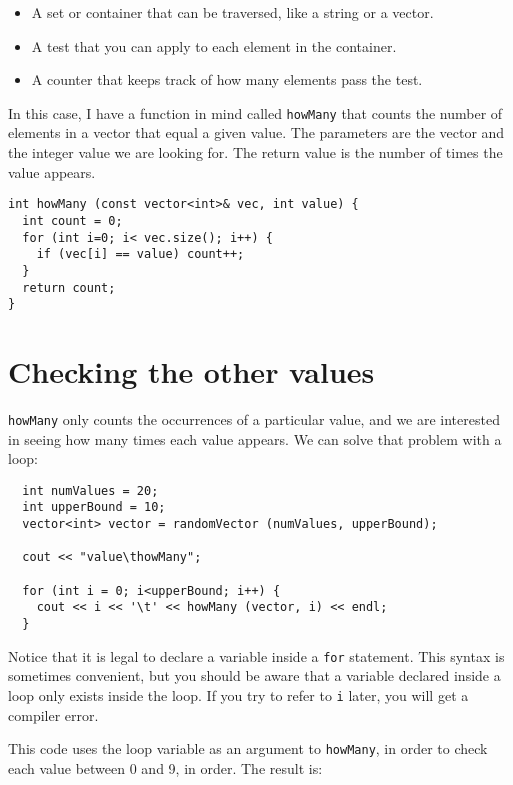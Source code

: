 \begin{itemize}

\item A set or container that can be traversed, like a string
or a vector.

\item A test that you can apply to each element in the container.

\item A counter that keeps track of how many elements pass
the test.

\end{itemize}

In this case, I have a function in mind called {\tt howMany} that
counts the number of elements in a vector that equal a given value.
The parameters are the vector and the integer value we are looking
for.  The return value is the number of times the value appears.

\begin{verbatim}
int howMany (const vector<int>& vec, int value) {
  int count = 0;
  for (int i=0; i< vec.size(); i++) {
    if (vec[i] == value) count++;
  }
  return count;
}
\end{verbatim}


\section{Checking the other values}

{\tt howMany} only counts the occurrences of a particular value, and
we are interested in seeing how many times each value appears.
We can solve that problem with a loop:

\begin{verbatim}
  int numValues = 20;
  int upperBound = 10;
  vector<int> vector = randomVector (numValues, upperBound);

  cout << "value\thowMany";

  for (int i = 0; i<upperBound; i++) {
    cout << i << '\t' << howMany (vector, i) << endl;
  }
\end{verbatim}
%
Notice that it is legal to declare a variable inside a {\tt for}
statement.  This syntax is sometimes convenient, but you should
be aware that a variable declared inside a loop only exists
inside the loop.  If you try to refer to {\tt i} later, you
will get a compiler error.

This code uses the loop variable as an argument to
{\tt howMany}, in order to check each value between 0 and 9,
in order.  The result is:

